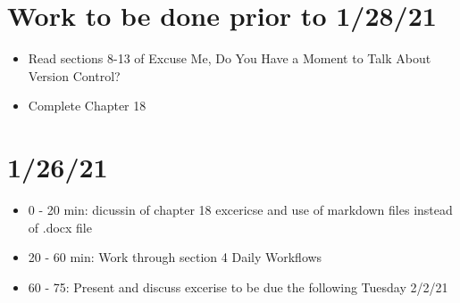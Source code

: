 \documentclass[
]{article}
\providecommand{\tightlist}{%
  \setlength{\itemsep}{0pt}\setlength{\parskip}{0pt}}
\begin{document}
\hypertarget{work-to-be-done-prior-to-12821}{%
\section{Work to be done prior to
1/28/21}\label{work-to-be-done-prior-to-12821}}

\begin{itemize}
\tightlist
\item
  Read sections 8-13 of Excuse Me, Do You Have a Moment to Talk About
  Version Control?
\item
  Complete Chapter 18
\end{itemize}

\hypertarget{section}{%
\section{1/26/21}\label{section}}

\begin{itemize}
\tightlist
\item
  0 - 20 min: dicussin of chapter 18 excericse and use of markdown files
  instead of .docx file
\item
  20 - 60 min: Work through section 4 Daily Workflows
\item
  60 - 75: Present and discuss excerise to be due the following Tuesday
  2/2/21
\end{itemize}
\end{document}
